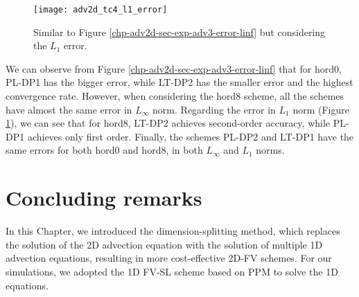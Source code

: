 \begin{figure}[!htb]
\centering
\texttt{[image: adv2d\_tc4\_l1\_error]}
\caption{Similar to Figure \ref{chp-adv2d-sec-exp-adv3-error-linf} but considering the $L_1$ error.
\label{chp-adv2d-sec-exp-adv3-error-l1}}
\end{figure}

We can observe from Figure \ref{chp-adv2d-sec-exp-adv3-error-linf} that for hord0, PL-DP1 has the bigger error,
while LT-DP2 has the smaller error and the highest convergence rate.
However, when considering the hord8 scheme, all the schemes have almost the same error in $L_{\infty}$ norm.
Regarding the error in $L_{1}$ norm (Figure \ref{chp-adv2d-sec-exp-adv3-error-l1}), we can see that for hord8,
LT-DP2 achieves second-order accuracy, while PL-DP1 achieves only first order.
Finally, the schemes PL-DP2 and LT-DP1 have the same errors for both hord0 and hord8, in both $L_{\infty}$ and $L_{1}$ norms.
%


\section{Concluding remarks}
In this Chapter, we introduced the dimension-splitting method, 
which replaces the solution of the 2D advection equation with the
solution of multiple 1D advection equations, resulting in more cost-effective 2D-FV schemes. 
For our simulations, we adopted the 1D FV-SL scheme based on PPM to solve the 1D equations.

